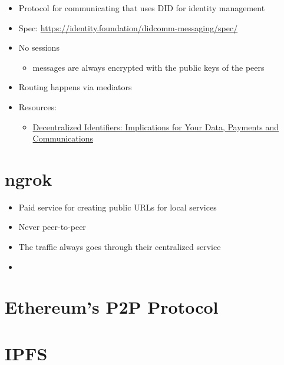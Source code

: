 \begin{itemize}
\tightlist
\item
  Protocol for communicating that uses DID for identity management
\item
  Spec: \url{https://identity.foundation/didcomm-messaging/spec/}
\item
  No sessions

  \begin{itemize}
  \tightlist
  \item
    messages are always encrypted with the public keys of the peers
  \end{itemize}
\item
  Routing happens via mediators
\item
  Resources:

  \begin{itemize}
  \tightlist
  \item
    \href{https://newsletter.impervious.ai/decentralized-identifiers-implications-for-your-data-payments-and-communications-2/}{Decentralized
    Identifiers: Implications for Your Data, Payments and
    Communications}
  \end{itemize}
\end{itemize}

\hypertarget{notes__02100-ngrok.md}{}
\hypertarget{notes__02100-ngrok.md__ngrok}{%
\section{ngrok}\label{notes__02100-ngrok.md__ngrok}}

\begin{itemize}
\tightlist
\item
  Paid service for creating public URLs for local services
\item
  Never peer-to-peer
\item
  The traffic always goes through their centralized service
\item
\end{itemize}

\hypertarget{notes__02110-ethereum.md}{}
\hypertarget{notes__02110-ethereum.md__ethereums-p2p-protocol}{%
\section{Ethereum's P2P
Protocol}\label{notes__02110-ethereum.md__ethereums-p2p-protocol}}

\hypertarget{notes__02120-ipfs.md}{}
\hypertarget{notes__02120-ipfs.md__ipfs}{%
\section{IPFS}\label{notes__02120-ipfs.md__ipfs}}

